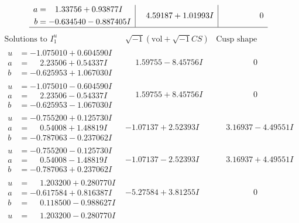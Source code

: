 \documentclass[1p]{elsarticle_modified}
\theoremstyle{definition}
\newcommand{\I}{\sqrt{-1}}
\begin{document}
$$\begin{array}{c|c|c}
\begin{aligned}
a &= \phantom{-}1.33756 + 0.93877 I \\
b &= -0.634540 - 0.887405 I\end{aligned}
 & \phantom{-}4.59187 + 1.01993 I & \phantom{-0.000000 } 0\\
 \hline 
 \end{array}$$\newpage$$\begin{array}{c|c|c}  
\text{Solutions to }I^u_{1}& \I (\text{vol} + \sqrt{-1}CS) & \text{Cusp shape}\\
 \hline 
\begin{aligned}
u &= -1.075010 + 0.604590 I \\
a &= \phantom{-}2.23506 + 0.54337 I \\
b &= -0.625953 + 1.067030 I\end{aligned}
 & \phantom{-}1.59755 - 8.45756 I & \phantom{-0.000000 } 0 \\ \hline\begin{aligned}
u &= -1.075010 - 0.604590 I \\
a &= \phantom{-}2.23506 - 0.54337 I \\
b &= -0.625953 - 1.067030 I\end{aligned}
 & \phantom{-}1.59755 + 8.45756 I & \phantom{-0.000000 } 0 \\ \hline\begin{aligned}
u &= -0.755200 + 0.125730 I \\
a &= \phantom{-}0.54008 + 1.48819 I \\
b &= -0.787063 - 0.237062 I\end{aligned}
 & -1.07137 + 2.52393 I & \phantom{-}3.16937 - 4.49551 I \\ \hline\begin{aligned}
u &= -0.755200 - 0.125730 I \\
a &= \phantom{-}0.54008 - 1.48819 I \\
b &= -0.787063 + 0.237062 I\end{aligned}
 & -1.07137 - 2.52393 I & \phantom{-}3.16937 + 4.49551 I \\ \hline\begin{aligned}
u &= \phantom{-}1.203200 + 0.280770 I \\
a &= -0.617584 + 0.816387 I \\
b &= \phantom{-}0.118500 - 0.988627 I\end{aligned}
 & -5.27584 + 3.81255 I & \phantom{-0.000000 } 0 \\ \hline\begin{aligned}
u &= \phantom{-}1.203200 - 0.280770 I \\

\end{aligned}
\end{array}$$
\end{document}
